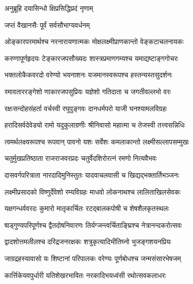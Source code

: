 

{अनुब्रूहि  दयासिन्धो  क्षिप्रसिद्धिप्रदं  नृणाम्}

{जप्तं  वैखानसैः  पूर्वं  सर्वसौभाग्यवर्धनम्}

\twolineshloka
{ओङ्कारपरमार्थश्च  नरनारायणात्मकः}
{मोक्षलक्ष्मीप्राणकान्तो वेङ्कटाचलनायकः}

\twolineshloka
{करुणापूर्णहृदयः टेङ्कारजपसौख्यदः}
{शास्त्रप्रमाणगम्यश्च यमाद्यष्टाङ्गगोचरः}

\twolineshloka
{भक्तलोकैकवरदो वरेण्यो भयनाशनः}
{यजमानस्वरूपश्च हस्तन्यस्तसुदर्शनः}

\twolineshloka
{रमावताररङ्गेशो णाकारजपसुप्रियः}
{यज्ञेशो गतिदाता च जगतीवल्लभो वरः}

\twolineshloka
{रक्षःसन्दोहसंहर्ता वर्चस्वी रघुपुङ्गवः}
{दानधर्मपरो याजी घनश्यामलविग्रहः}

\twolineshloka
{हरादिसर्वदेवेड्यो रामो यदुकुलाग्रणीः}
{श्रीनिवासो महात्मा च तेजस्वी तत्त्वसन्निधिः}

\twolineshloka
{त्वमर्थलक्ष्यरूपश्च रूपवान् पावनो यशः}
{सर्वेशः कमलाकान्तो लक्ष्मीसल्लापसम्मुखः}

\twolineshloka
{चतुर्मुखप्रतिष्ठाता राजराजवरप्रदः}
{चतुर्वेदशिरोरत्नं रमणो नित्यवैभवः}

\twolineshloka
{दासवर्गपरित्राता नारदादिमुनिस्तुतः}
{यादवाचलवासी च खिद्यद्भक्तार्तिभञ्जनः}

\twolineshloka
{लक्ष्मीप्रसादको विष्णुर्देवेशो रम्यविग्रहः}
{माधवो लोकनाथश्च लालिताखिलसेवकः}

\twolineshloka
{यक्षगन्धर्ववरदः कुमारो मातृकार्चितः}
{रटद्बालकपोषी च शेषशैलकृतस्थलः}

\twolineshloka
{षाड्गुण्यपरिपूर्णश्च द्वैतदोषनिवारणः}
{तिर्यग्जन्त्वर्चिताङ्घ्रिश्च नेत्रानन्दकरोत्सवः}

\twolineshloka
{द्वादशोत्तमलीलश्च दरिद्रजनरक्षकः}
{शत्रुकृत्यादिभीतिघ्नो भुजङ्गशयनप्रियः}

\twolineshloka
{जाग्रद्रहस्यावासो यः शिष्टानां  परिपालकः}
{वरेण्यः पूर्णबोधश्च जन्मसंसारभेषजम्}

\twolineshloka
{कार्त्तिकेयवपुर्धारी यतिशेखरभावितः}
{नरकादिभयध्वंसी रथोत्सवकलाधरः}

